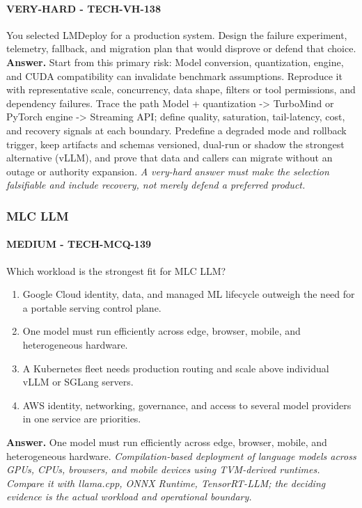 \paragraph{VERY-HARD - TECH-VH-138} You selected LMDeploy for a production system. Design the failure experiment, telemetry, fallback, and migration plan that would disprove or defend that choice.
\textbf{Answer.} Start from this primary risk: Model conversion, quantization, engine, and CUDA compatibility can invalidate benchmark assumptions. Reproduce it with representative scale, concurrency, data shape, filters or tool permissions, and dependency failures. Trace the path Model + quantization -> TurboMind or PyTorch engine -> Streaming API; define quality, saturation, tail-latency, cost, and recovery signals at each boundary. Predefine a degraded mode and rollback trigger, keep artifacts and schemas versioned, dual-run or shadow the strongest alternative (vLLM), and prove that data and callers can migrate without an outage or authority expansion.
\textit{A very-hard answer must make the selection falsifiable and include recovery, not merely defend a preferred product.}
\subsubsection*{MLC LLM}
\paragraph{MEDIUM - TECH-MCQ-139} Which workload is the strongest fit for MLC LLM?
\begin{enumerate}[label=\Alph*.]
\item Google Cloud identity, data, and managed ML lifecycle outweigh the need for a portable serving control plane.
\item One model must run efficiently across edge, browser, mobile, and heterogeneous hardware.
\item A Kubernetes fleet needs production routing and scale above individual vLLM or SGLang servers.
\item AWS identity, networking, governance, and access to several model providers in one service are priorities.
\end{enumerate}
\textbf{Answer.} One model must run efficiently across edge, browser, mobile, and heterogeneous hardware.
\textit{Compilation-based deployment of language models across GPUs, CPUs, browsers, and mobile devices using TVM-derived runtimes. Compare it with llama.cpp, ONNX Runtime, TensorRT-LLM; the deciding evidence is the actual workload and operational boundary.}
